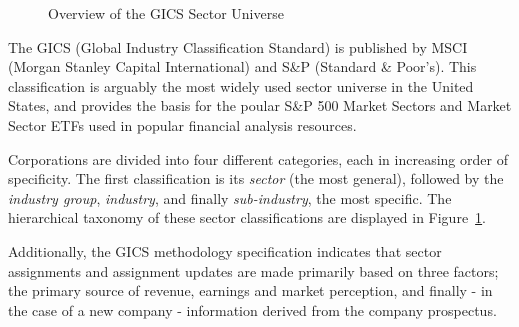 \documentclass[../main.tex]{subfiles}
\begin{document}
\begin{figure}
    \centering
    \vspace{\wrapfigadjustment}
    \caption{Overview of the GICS Sector Universe}
    \label{fig:introduction:gics_breakdown}
\end{figure}

The GICS (Global Industry Classification Standard) is published by MSCI (Morgan Stanley Capital International) and S\&P (Standard \& Poor's). This classification is arguably the most widely used sector universe in the United States, and provides the basis for the poular S\&P 500 Market Sectors and Market Sector ETFs used in popular financial analysis resources.

Corporations are divided into four different categories, each in increasing order of specificity. The first classification is its \textit{sector} (the most general), followed by the \textit{industry group}, \textit{industry}, and finally \textit{sub-industry}, the most specific. The hierarchical taxonomy of these sector classifications are displayed in Figure~\ref{fig:introduction:gics_breakdown}.

Additionally, the GICS methodology specification indicates that sector assignments and assignment updates are made primarily based on three factors; the primary source of revenue, earnings and market perception, and finally - in the case of a new company - information derived from the company prospectus.
\end{document}
